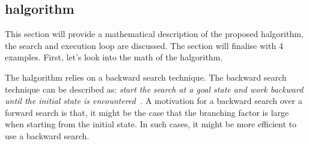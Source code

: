 \subsection{\acl{halgorithm}}%
\label{subsec:halgorithm}
This section will provide a mathematical description of the proposed \ac{halgorithm}, the search and execution loop are discussed. The section will finalise with 4 examples. First, let's look into the math of the \ac{halgorithm}.\bs

The \ac{halgorithm} relies on a backward search technique. The backward search technique can be described as: \textit{start the search at a goal state and work backward until the initial state is encountered~\cite{lavalle_planning_2006}.} A motivation for a backward search over a forward search is that, it might be the case that the branching factor is large when starting from the initial state. In such cases, it might be more efficient to use a backward search.

